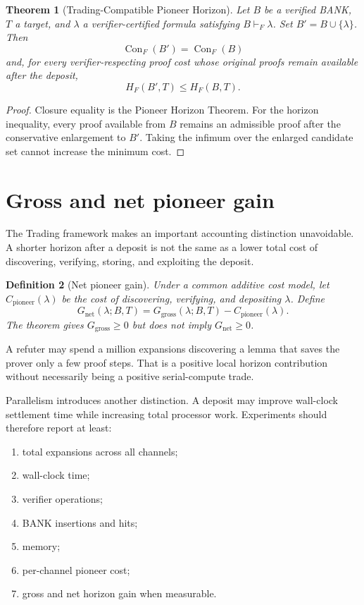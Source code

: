 \documentclass[11pt]{article}
\newtheorem{definition}{Definition}[section]
\newtheorem{theorem}[definition]{Theorem}
\theoremstyle{remark}
\newcommand{\Con}{\operatorname{Con}}
\begin{document}
\begin{theorem}[Trading-Compatible Pioneer Horizon]
Let $B$ be a verified BANK, $T$ a target, and $\lambda$ a verifier-certified formula satisfying $B\vdash_F\lambda$. Set $B'=B\cup\{\lambda\}$. Then
\[
\Con_F(B')=\Con_F(B)
\]
and, for every verifier-respecting proof cost whose original proofs remain available after the deposit,
\[
H_F(B',T)\le H_F(B,T).
\]
\end{theorem}
\begin{proof}
Closure equality is the Pioneer Horizon Theorem. For the horizon inequality, every proof available from $B$ remains an admissible proof after the conservative enlargement to $B'$. Taking the infimum over the enlarged candidate set cannot increase the minimum cost.
\end{proof}

\section{Gross and net pioneer gain}
The Trading framework makes an important accounting distinction unavoidable. A shorter horizon after a deposit is not the same as a lower total cost of discovering, verifying, storing, and exploiting the deposit.

\begin{definition}[Net pioneer gain]
Under a common additive cost model, let $C_{\mathrm{pioneer}}(\lambda)$ be the cost of discovering, verifying, and depositing $\lambda$. Define
\[
G_{\mathrm{net}}(\lambda;B,T)=G_{\mathrm{gross}}(\lambda;B,T)-C_{\mathrm{pioneer}}(\lambda).
\]
The theorem gives $G_{\mathrm{gross}}\ge0$ but does not imply $G_{\mathrm{net}}\ge0$.
\end{definition}
A refuter may spend a million expansions discovering a lemma that saves the prover only a few proof steps. That is a positive local horizon contribution without necessarily being a positive serial-compute trade.

Parallelism introduces another distinction. A deposit may improve wall-clock settlement time while increasing total processor work. Experiments should therefore report at least:
\begin{enumerate}
\item total expansions across all channels;
\item wall-clock time;
\item verifier operations;
\item BANK insertions and hits;
\item memory;
\item per-channel pioneer cost;
\item gross and net horizon gain when measurable.
\end{enumerate}
\end{document}
